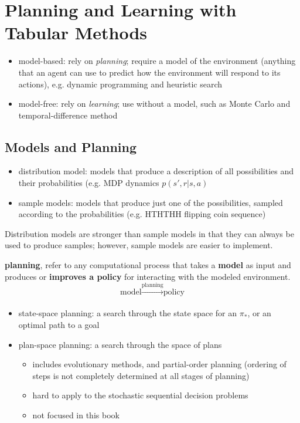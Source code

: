 \documentclass[sutton_barto_notes.tex]{subfiles}
\begin{document}
\newpage
\section{Planning and Learning with Tabular Methods}

\begin{itemize}
\item model-based: rely on \textit{planning}; require a model of the environment (anything that an agent can use to predict how the environment will respond to its actions), e.g. dynamic programming and heuristic search
\item model-free: rely on \textit{learning}; use without a model, such as Monte Carlo and temporal-difference method
\end{itemize}


\subsection{Models and Planning}

\begin{itemize}
\item distribution model: models that produce a description of all possibilities and their probabilities (e.g. MDP dynamics $p(s',r|s,a)$
\item sample models: models that produce just one of the possibilities, sampled according to the probabilities (e.g. HTHTHH flipping coin sequence)
\end{itemize}

Distribution models are stronger than sample models in that they can always be used to produce samples; however, sample models are easier to implement.

\begin{definition}
\textbf{planning}, refer to any computational process that takes a \textbf{model} as input and produces or \textbf{improves a policy} for interacting with the modeled environment.
$$\text{model} \xrightarrow[]{\text{planning}} \text{policy} $$
\end{definition}

\begin{itemize}
\item state-space planning: a search through the state space for an $\pi_*$, or an optimal path to a goal
\item plan-space planning: a search through the space of plans
\begin{itemize}
	\item includes evolutionary methods, and partial-order planning (ordering of steps is not completely determined at all stages of planning)
	\item hard to apply to the stochastic sequential decision problems
	\item not focused in this book
\end{itemize}
\end{itemize}
\end{document}
